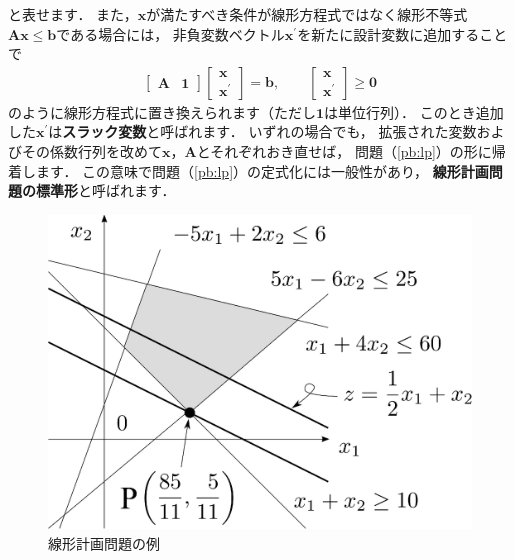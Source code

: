 ﻿\documentclass[a4paper]{jsarticle}
\begin{document}
と表せます．
また，$\boldsymbol{x}$が満たすべき条件が線形方程式ではなく線形不等式$\boldsymbol{Ax}\leq\boldsymbol{b}$である場合には，
非負変数ベクトル$\boldsymbol{x}^{\prime}$を新たに設計変数に追加することで
\begin{align*}
\begin{bmatrix}
\boldsymbol{A} & \boldsymbol{1}
\end{bmatrix}
\begin{bmatrix}
\boldsymbol{x} \\ \boldsymbol{x}^{\prime}
\end{bmatrix}
=
\boldsymbol{b},\qquad
\begin{bmatrix}
\boldsymbol{x} \\ \boldsymbol{x}^{\prime}
\end{bmatrix}
\geq\boldsymbol{0}
\end{align*}
のように線形方程式に置き換えられます（ただし$\boldsymbol{1}$は単位行列）．
このとき追加した$\boldsymbol{x}^{\prime}$は{\bf スラック変数}と呼ばれます．
いずれの場合でも，
拡張された変数およびその係数行列を改めて$\boldsymbol{x}$，$\boldsymbol{A}$とそれぞれおき直せば，
問題（\ref{pb:lp}）の形に帰着します．
この意味で問題（\ref{pb:lp}）の定式化には一般性があり，
{\bf 線形計画問題の標準形}と呼ばれます．

\begin{figure}[h]
\begin{center}
\includegraphics[width=.4\textwidth]{fig/LP_feasibleregion.eps}
\caption{線形計画問題の例}
\label{fig:LP_feasibleregion}
\end{center}
\end{figure}
\end{document}
